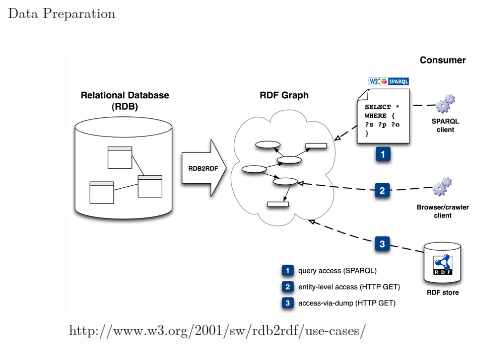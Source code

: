 \message{ !name(presentation.tex)}\documentclass{beamer}
\begin{document}
\begin{frame}{Data Preparation}
\begin{columns}
\begin{column}{.3\textwidth}
\end{column}%
\hfill%
\begin{column}{.66\textwidth}
\begin{figure}
\includegraphics[width=\textwidth,height=.88\textheight,keepaspectratio]{rdb2rdf}
{\footnotesize \caption{http://www.w3.org/2001/sw/rdb2rdf/use-cases/}}
\end{figure}
\end{column}%
\end{columns}
\end{frame}
\end{document}
